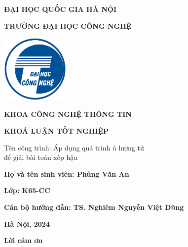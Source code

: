 \documentclass[13pt, a4paper]{report}
\begin{document}
\providecommand{\keywords}[1]
{
  \textbf{{Từ khóa: }} #1
}
\begin{titlepage}

\begin{center}
{\bfseries\large ĐẠI HỌC QUỐC GIA HÀ NỘI \par}
{\bfseries\large TRƯỜNG ĐẠI HỌC CÔNG NGHỆ \par}
\vspace{10mm}
{\includegraphics[width=0.25\textwidth]{images/logo/uet.png} \par}

\vspace{0.5cm}
{\bfseries\large KHOA CÔNG NGHỆ THÔNG TIN \par}
\vspace{0.5cm}

{\bfseries\huge KHOÁ LUẬN TỐT NGHIỆP \par}
\vspace{0.5cm}
{\mdseries\huge Tên công trình: Áp dụng quá trình ủ lượng tử
	\\ để giải bài toán xếp hậu \par}
\vspace{1cm}
\end{center}

{\large \textbf{Họ và tên sinh viên: Phùng Văn An} \par}
\vspace{0.3cm}


{\large \textbf{Lớp: K65-CC} \par}
\vspace{0.3cm}

{\large \textbf{Cán bộ hướng dẫn: TS. Nghiêm Nguyễn Việt Dũng} \par}
\vspace{0.3cm}

\vfill

\centering
{\bfseries\large Hà Nội, 2024 \par}
\end{titlepage}
\newpage
\thispagestyle{empty}
\centerline{\huge{\textbf{Lời cảm ơn}}}
\end{document}
